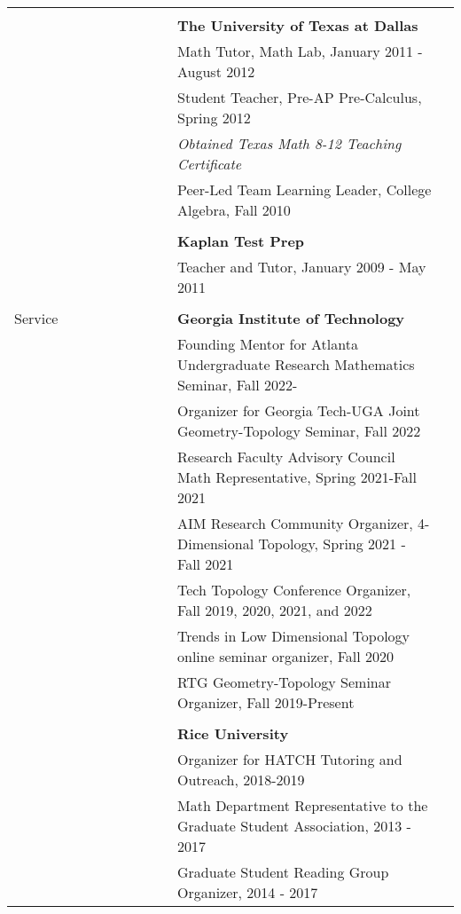 \documentclass[letterpaper,11pt,oneside]{article}
\begin{document}
\begin{tabular}{@{} l l l}
       \Large{}   & \\
     &\textbf{The University of Texas at Dallas} \\
     & Math Tutor, Math Lab, January 2011 - August 2012 \\
     & Student Teacher, Pre-AP Pre-Calculus, Spring 2012 \\
     & \textit{Obtained Texas Math 8-12 Teaching Certificate}\\
          & Peer-Led Team Learning Leader, College Algebra, Fall 2010 \\
     & \\
     
     
     & \textbf{Kaplan Test Prep} \\
     & Teacher and Tutor, January 2009 - May 2011 \\
     & \\
     
   
            
       \Large{Service \ \ \ \ \ }       &\textbf{Georgia Institute of Technology} \\
       & Founding Mentor for Atlanta Undergraduate Research Mathematics Seminar, Fall 2022- \\
       & Organizer for Georgia Tech-UGA Joint Geometry-Topology Seminar, Fall 2022\\
         & Research Faculty Advisory Council Math Representative, Spring 2021-Fall 2021\\
          & AIM Research Community Organizer, 4-Dimensional Topology, Spring 2021 - Fall 2021\\
        & Tech Topology Conference Organizer, Fall 2019, 2020, 2021, and 2022\\
             & Trends in Low Dimensional Topology online seminar organizer, Fall 2020\\
                 & RTG Geometry-Topology Seminar Organizer, Fall 2019-Present\\
       \\
            

       
     \ \ \ \ \ \ \ \ \ \ \ \ \ \ \ \ \ \ \ \ \  &\textbf{Rice University} \\
       
       & Organizer for HATCH Tutoring and Outreach, 2018-2019\\
       
      & Math Department Representative to the Graduate Student Association, 2013 - 2017 \\
      & Graduate Student Reading Group Organizer, 2014 - 2017\\
     

\end{tabular}
\end{document}
